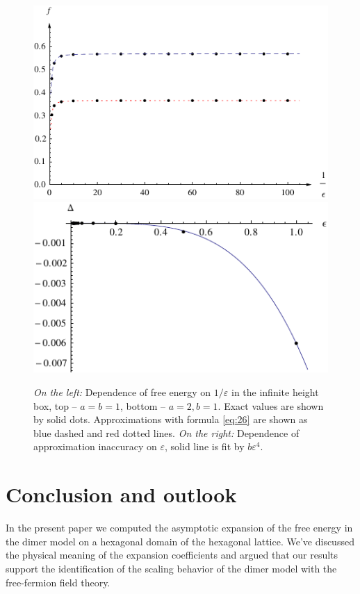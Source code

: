 \documentclass{article}
\begin{document}
\begin{figure}[htbp]
  \includegraphics[scale=0.8]{exact-vs-approximation-2d}
  \includegraphics[scale=0.9]{error-2d}
  \caption{\label{fig:approx-acc-2d} {\it On the left:} Dependence of free energy on $1/\varepsilon$
    in the infinite height box,
    top -- $a=b=1$, bottom -- $a=2, b=1$. Exact values are shown by solid dots.
    Approximations with formula \eqref{eq:26} are shown as blue dashed and red dotted lines. {\it On
      the right:} Dependence of approximation inaccuracy on $\varepsilon$, solid line is fit by $b\varepsilon^{4}$.}
\end{figure}

\section*{Conclusion and outlook}
\label{sec:conclusion}

In the present paper we computed the asymptotic expansion of the free energy in the dimer model on a
hexagonal domain of the hexagonal lattice. We've discussed the physical meaning of the expansion
coefficients and argued that our results support the identification of the scaling behavior of the
dimer model with the free-fermion field theory.
\end{document}
